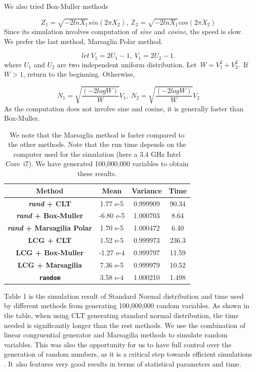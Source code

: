 \documentclass[11pt,a4paper,fleqn]{article}
\newcommand\Z{\mathbb Z}
\begin{document}
We also tried Box-Muller methods  \cite{lectures}

$$Z_1 = \sqrt{-2lnX_1}sin(2\pi X_2),\  \Z_2=\sqrt{-2lnX_1}cos(2\pi X_2)$$Since its simulation involves computation of \textit{sine} and \textit{cosine}, the speed is slow.
We prefer the last method, Marsaglia Polar method.

$$ let \ V_1 = 2U_1-1,\  V_1 = 2U_2-1.$$
where $U_1$ and $U_2$ are two independent uniform distribution.
 Let\ $W = V_1^2+V_2^2.$\ If $W>1$, return to the beginning. Otherwise,

$$N_1 = \sqrt{\frac{(-2logW)}{W}}V_1,\ N_2 = \sqrt{\frac{(-2logW)}{W}}V_2$$As the computation does not involve sine and cosine, it is generally faster than Box-Muller.



\begin{table} [h!]
\centering
\begin{tabular}{| c| c| c| c| }
\hline
\textbf{ Method} &\textbf{ Mean} & \textbf{Variance}&\textbf{ Time} \\ \hline
\textbf{\textit{ rand}  + CLT} & 1.77 e-5 & 0.999909 & 90.34 \\  \hline
\textbf{\textit{ rand}  + Box-Muller} & -6.80 e-5 & 1.000703&8.64\\ \hline
\textbf{\textit{ rand}  + Marsagilia Polar} & 1.70 e-5& 1.000472& 6.40\\ \hline
\textbf{ LCG + CLT} & 1.52 e-5& 0.999973&236.3\\ \hline
\textbf{LCG + Box-Muller} & -1.27 e-4 & 0.999797&11.59\\ \hline
\textbf{ LCG + Marsagilia} & 7.36 e-5 & 0.999979&10.52\\ \hline
\textbf{\texttt{random} }& 3.58 e-4 & 1.000210&1.498\\ \hline
\end{tabular}
\caption{We note that the Marsaglia method is faster compared to the other methods. Note that the run time depends on the computer used for the simulation (here a 3.4 GHz Intel Core~i7). We have generated 100,000,000 variables to obtain these results.}
\end{table}

Table 1  is the simulation result of Standard Normal distribution and time used by different methods from generating 100,000,000 random variables. As shown in the table, when using CLT generating standard normal distribution, the time needed is significantly longer than the rest methods. We use the combination of linear congruential generator and Marsagilia methods to simulate random variables. This was also the opportunity for us to have full control over the generation of random numbers, as it is a critical step towards efficient simulations \cite{lectures}. It also features very good results in terms of statistical parameters and time.
\end{document}
